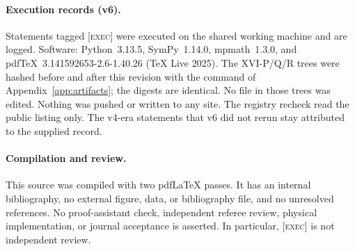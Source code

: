 \paragraph{Execution records (v6).}
Statements tagged \textsc{[exec]} were executed on the shared
working machine and are logged.
Software: Python~3.13.5, SymPy~1.14.0, mpmath~1.3.0, and
pdfTeX~3.141592653-2.6-1.40.26 (TeX Live 2025).
The XVI-P/Q/R trees were hashed before and after this revision with
the command of Appendix~\ref{app:artifacts}; the digests are
identical.
No file in those trees was edited.
Nothing was pushed or written to any site.
The registry recheck read the public listing only.
The v4-era statements that v6 did not rerun stay attributed to
the supplied record.

\paragraph{Compilation and review.}
This source was compiled with two pdfLaTeX passes. It has an
internal bibliography, no external figure, data, or bibliography
file, and no unresolved references.
No proof-assistant check, independent referee review, physical
implementation, or journal acceptance is asserted.
In particular, \textsc{[exec]} is not independent review.
